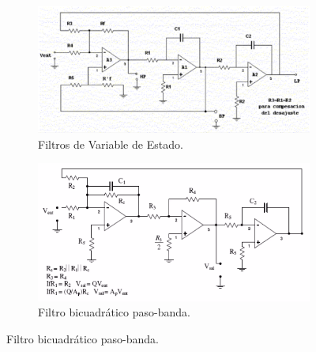 \begin{figure}[H]
    \centering
    \begin{subfigure}[c]{0.45\textwidth}
        \includegraphics[width=\textwidth]{Imagenes/Filtros de Variable de Estado.png}
        \caption{Filtros de Variable de Estado.}
    \end{subfigure}
    \begin{subfigure}[c]{0.45\textwidth}
        \includegraphics[width=\textwidth]{Imagenes/Filtros Bicuadratico.png}
        \caption{Filtro bicuadrático paso-banda.}
    \end{subfigure}
\end{figure}